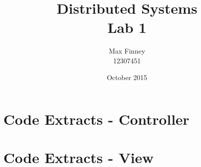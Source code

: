\documentclass[12pt]{article}
\begin{document}
\title{Distributed Systems\\Lab 1}
\date{October 2015}
\author{Max Finney\\12307451}
\maketitle
\newpage
\section*{Code Extracts - Controller}

\section*{Code Extracts - View}

\end{document}
